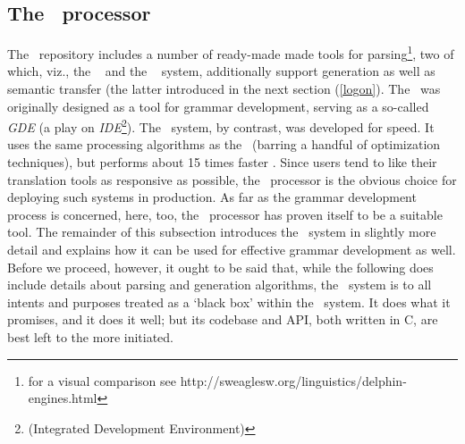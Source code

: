 
\subsection{The \ace\ processor}
\label{sub:ace}

The \delphin\ repository includes a number of ready-made made tools for
parsing\footnote{for a visual comparison see
http://sweaglesw.org/linguistics/delphin-engines.html}, two of which, viz., the
\lkb\ \citep{copestake2002implementing} and the \ace\ \citep{sweaglesACE}
system, additionally support generation as well as semantic transfer (the
latter introduced in the next section (\ref{logon}). The \lkb\ was originally
designed as a tool for grammar development, serving as a so-called \emph{GDE}
(a play on \emph{IDE}\footnote{(Integrated Development Environment)}). The
\ace\ system, by contrast, was developed for speed. It uses the same processing
algorithms as the \lkb\ (barring a handful of optimization techniques), but
performs about 15 times faster \citep{sweaglesACE}. Since users tend to like
their translation tools as responsive as possible, the \ace\ processor is the
obvious choice for deploying such systems in production. As far as the grammar
development process is concerned, here, too, the \ace\ processor has proven
itself to be a suitable tool. The remainder of this subsection introduces the
\ace\ system in slightly more detail and explains how it can be used for
effective grammar development as well. Before we proceed, however, it ought to
be said that, while the following does include details about parsing and
generation algorithms, the \ace\ system is to all intents and purposes treated
as a `black box' within the \depicto\ system. It does what it promises, and it
does it well; but its codebase and API, both written in C, are best left to the
more initiated.

